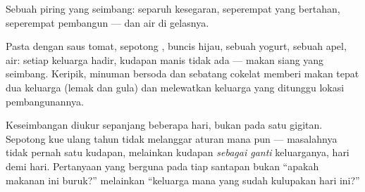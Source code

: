 \begin{omfigure}

{\small Sebuah piring yang seimbang: separuh kesegaran, seperempat
 yang bertahan, seperempat pembangun --- dan air di gelasnya.}
\end{omfigure}

\begin{example}\label{ex:g3:balanced-diet:lunch}
Pasta dengan saus tomat, sepotong , buncis hijau, sebuah yogurt,
sebuah apel, air: setiap keluarga hadir, kudapan manis tidak ada ---
makan siang yang seimbang. Keripik, minuman bersoda dan sebatang
cokelat memberi makan tepat dua keluarga (lemak dan gula) dan
melewatkan keluarga yang ditunggu lokasi pembangunannya.
\end{example}

\begin{remark}\label{rem:g3:balanced-diet:balance}
Keseimbangan diukur sepanjang beberapa hari, bukan pada satu gigitan.
Sepotong kue ulang tahun tidak melanggar aturan mana pun --- masalahnya
tidak pernah satu kudapan, melainkan kudapan \emph{sebagai ganti}
keluarganya, hari demi hari. Pertanyaan yang berguna pada tiap santapan
bukan ``apakah makanan ini buruk?'' melainkan ``keluarga mana yang
sudah kulupakan hari ini?''
\end{remark}

